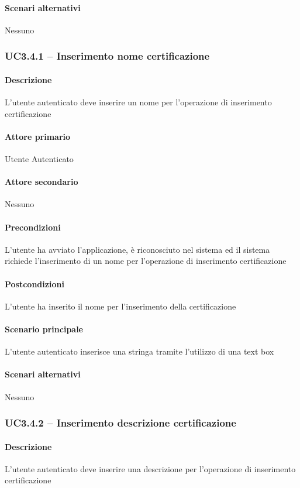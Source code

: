 \paragraph{Scenari alternativi}  Nessuno



\subsubsection{UC3.4.1 – Inserimento nome certificazione}
\paragraph{Descrizione}  L’utente autenticato deve inserire un nome per l’operazione di inserimento certificazione
\paragraph{Attore primario}  Utente Autenticato
\paragraph{Attore secondario}  Nessuno
\paragraph{Precondizioni}  L’utente ha avviato l’applicazione, è riconosciuto nel sistema ed il sistema richiede l’inserimento di un nome per l’operazione di inserimento certificazione
\paragraph{Postcondizioni}  L’utente ha inserito il nome per l’inserimento della certificazione
\paragraph{Scenario principale}  
L’utente autenticato inserisce una stringa tramite l’utilizzo di una text box
\paragraph{Scenari alternativi}  Nessuno



\subsubsection{UC3.4.2 – Inserimento descrizione certificazione}
\paragraph{Descrizione}  L’utente autenticato deve inserire una descrizione per l’operazione di inserimento certificazione
